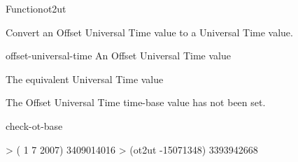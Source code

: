 \documentclass[10pt,twoside,english,pdftex]{article}
\begin{document}

\begin{functiondoc}{Function}{ot2ut}{
  \returns{} }
%

\fnsyntax

\fnpurpose Convert an Offset Universal Time value to a Universal Time 
value.

\fnpackage {}

\fnmodule {}

\fnargs
\begin{args}{offset-universal-time}
 An Offset Universal Time value
\end{args}

\fnreturns The equivalent Universal Time value

\fnerrors The Offset Universal Time time-base value has not been set.

\begin{alsos}{check-ot-base}
\also[ut2ot]
\end{alsos}

\fnexample
\begin{example}
> ( 1 7 2007)
3409014016
> (ot2ut -15071348)
3393942668
\end{example}

\end{functiondoc}

\end{document}
